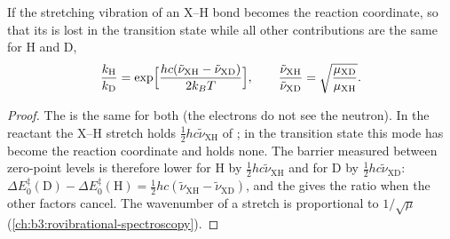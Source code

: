 \begin{proposition}\label{prop:b3:rate-theories:primary-kie}
If the stretching vibration of an X--H bond becomes the reaction coordinate,
so that its  is lost in the transition state while all other
contributions are the same for H and D,
\[
  \frac{k_{\mathrm H}}{k_{\mathrm D}} = \exp\Bigl[\frac{hc(\tilde\nu_{\mathrm{XH}} - \tilde\nu_{\mathrm{XD}})}{2k_BT}\Bigr],
  \qquad \frac{\tilde\nu_{\mathrm{XH}}}{\tilde\nu_{\mathrm{XD}}} = \sqrt{\frac{\mu_{\mathrm{XD}}}{\mu_{\mathrm{XH}}}} .
\]
\end{proposition}

\begin{proof}
The  is the same for both  (the
electrons do not see the neutron). In the reactant the X--H stretch holds
$\frac12hc\tilde\nu_{\mathrm{XH}}$ of ; in the transition state this mode has become
the reaction coordinate and holds none. The barrier measured between zero-point
levels is therefore lower for H by $\frac12hc\tilde\nu_{\mathrm{XH}}$ and for D by $\frac12hc\tilde\nu_{\mathrm{XD}}$: $\Delta E_0^{\ddagger}(\mathrm D) -
\Delta E_0^{\ddagger}(\mathrm H) = \frac12hc(\tilde\nu_{\mathrm{XH}} - \tilde\nu_{\mathrm{XD}})$, and the  gives the ratio when
the other factors cancel. The wavenumber of a stretch is proportional to
$1/\sqrt\mu$ (\cref{ch:b3:rovibrational-spectroscopy}).
\end{proof}

